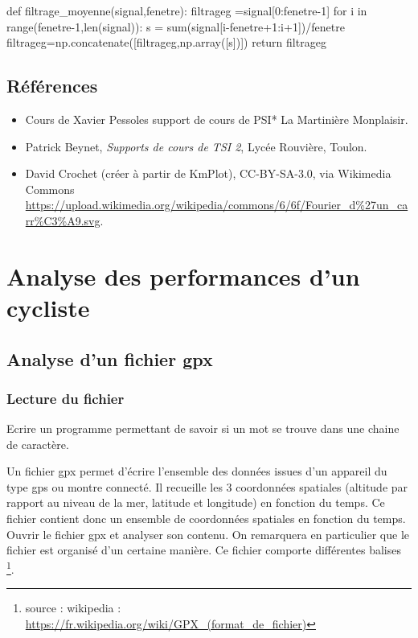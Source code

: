 \begin{pyverbatim}
def filtrage_moyenne(signal,fenetre):
    filtrageg =signal[0:fenetre-1]
    for i in range(fenetre-1,len(signal)):
        s = sum(signal[i-fenetre+1:i+1])/fenetre
        filtrageg=np.concatenate([filtrageg,np.array([s])])
    return filtrageg
\end{pyverbatim}

\subsection{Références} 
\begin{itemize}
\item Cours de Xavier Pessoles support de cours de  PSI* La Martinière Monplaisir.
\item Patrick Beynet, \textit{Supports de cours de TSI 2}, Lycée Rouvière, Toulon.
\item David Crochet (créer à partir de KmPlot), CC-BY-SA-3.0, via Wikimedia Commons \url{https://upload.wikimedia.org/wikipedia/commons/6/6f/Fourier_d\%27un_carr\%C3\%A9.svg}.
\end{itemize}

\section{Analyse des performances d'un cycliste}

\subsection{Analyse d'un fichier gpx}

\subsubsection{Lecture du fichier}

 
\question{} Ecrire un programme permettant de savoir si un mot se trouve dans une chaine de caractère.

Un fichier gpx permet d'écrire l'ensemble des données issues d'un appareil du type gps ou montre connecté. Il recueille les 3 coordonnées spatiales (altitude par rapport au niveau de la mer, latitude et longitude) en fonction du temps. Ce fichier contient donc un ensemble de coordonnées spatiales en fonction du temps.
Ouvrir le fichier gpx et analyser son contenu.
On remarquera en particulier que le fichier est organisé d'un certaine manière. Ce fichier comporte différentes balises \footnote{source : wikipedia : \url{https://fr.wikipedia.org/wiki/GPX_(format_de_fichier)}}.


